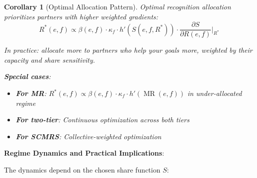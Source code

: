 \documentclass[11pt,a4paper]{article}
\newtheorem{corollary}[theorem]{Corollary}
\theoremstyle{definition}
\theoremstyle{remark}
\DeclareMathOperator{\MR}{MR}
\begin{document}
\begin{corollary}[Optimal Allocation Pattern]
Optimal recognition allocation prioritizes partners with higher weighted gradients:
\[ R^*(e,f) \propto \beta(e,f) \cdot \kappa_f \cdot h'(S(e,f,R^*)) \cdot \frac{\partial S}{\partial R(e,f)}\bigg|_{R^*} \]

In practice: allocate more to partners who help your goals more, weighted by their capacity and share sensitivity.

\textbf{Special cases}:
\begin{itemize}
\item \textbf{For MR}: $R^*(e,f) \propto \beta(e,f) \cdot \kappa_f \cdot h'(\MR(e,f))$ in under-allocated regime
\item \textbf{For two-tier}: Continuous optimization across both tiers
\item \textbf{For SCMRS}: Collective-weighted optimization
\end{itemize}
\end{corollary}

\textbf{Regime Dynamics and Practical Implications}:

The dynamics depend on the chosen share function $S$:
\end{document}
